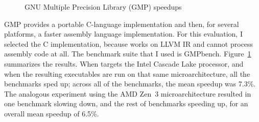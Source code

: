 \begin{figure}[tbp]
  \centering
  \hfill
  \caption{GNU Multiple Precision Library (GMP) speedups}
  \label{fig:gmp}
\end{figure}


GMP provides a portable C-language implementation and then, for
several platforms, a faster assembly language implementation.
%
For this evaluation, I selected the C implementation, because \minotaur{}
works on LLVM IR and cannot process assembly code at all.
%
The benchmark suite that I used is
GMPbench.%
%
Figure~\ref{fig:gmp} summarizes the results.
%
When \minotaur{} targets the Intel Cascade Lake processor, and when the
resulting executables are run on that same microarchitecture,
all the benchmarks sped up;
across all of the benchmarks, the mean speedup was 7.3\%.
%
The analogous experiment using the AMD Zen~3 microarchitecture
resulted in one benchmark slowing down, and the rest of benchmarks
speeding up, for an overall mean speedup of 6.5\%.


